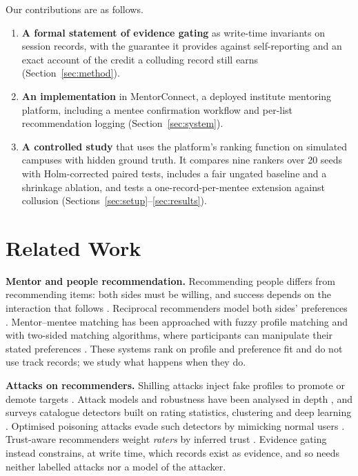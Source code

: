 \documentclass[conference]{IEEEtran}
\begin{document}
Our contributions are as follows.
\begin{enumerate}
\item \textbf{A formal statement of evidence gating} as write-time invariants on session records, with the guarantee it provides against self-reporting and an exact account of the credit a colluding record still earns (Section~\ref{sec:method}).
\item \textbf{An implementation} in MentorConnect, a deployed institute mentoring platform, including a mentee confirmation workflow and per-list recommendation logging (Section~\ref{sec:system}).
\item \textbf{A controlled study} that uses the platform's ranking function on simulated campuses with hidden ground truth. It compares nine rankers over 20 seeds with Holm-corrected paired tests, includes a fair ungated baseline and a shrinkage ablation, and tests a one-record-per-mentee extension against collusion (Sections~\ref{sec:setup}--\ref{sec:results}).
\end{enumerate}

\section{Related Work}
\label{sec:related}
\textbf{Mentor and people recommendation.} Recommending people differs from recommending items: both sides must be willing, and success depends on the interaction that follows \cite{terveen2005}. Reciprocal recommenders model both sides' preferences \cite{pizzato2010}. Mentor--mentee matching has been approached with fuzzy profile matching \cite{pham2023} and with two-sided matching algorithms, where participants can manipulate their stated preferences \cite{haas2019}. These systems rank on profile and preference fit and do not use track records; we study what happens when they do.

\textbf{Attacks on recommenders.} Shilling attacks inject fake profiles to promote or demote targets \cite{lam2004}. Attack models and robustness have been analysed in depth \cite{mobasher2007,gunes2014}, and surveys catalogue detectors built on rating statistics, clustering and deep learning \cite{si2020,sundar2020}. Optimised poisoning attacks evade such detectors by mimicking normal users \cite{li2016,fang2018}. Trust-aware recommenders weight \emph{raters} by inferred trust \cite{massa2007}. Evidence gating instead constrains, at write time, which records exist as evidence, and so needs neither labelled attacks nor a model of the attacker.
\end{document}
